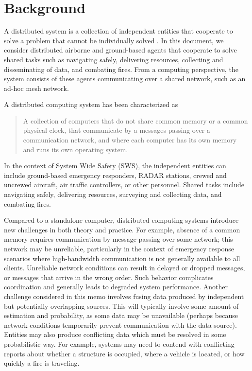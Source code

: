 \section{Background}
A distributed system is a collection of independent entities that
cooperate to solve a problem that cannot be individually solved
\cite{kshemkalyani_singhal_2008}. In this document, we consider
distributed airborne and ground-based agents that cooperate to solve
shared tasks such as navigating safely, delivering resources,
collecting and disseminating of data, and combating fires. From a
computing perspective, the system consists of these agents
communicating over a shared network, such as an ad-hoc mesh network.

A distributed computing system has been characterized as

\begin{quotation}
   A collection of computers that do not share common memory or a common
   physical clock, that communicate by a messages passing over a communication
   network, and where each computer has its own memory and runs its own
   operating system.
   \cite{10.5555/562065}
\end{quotation}


In the context of System Wide Safety (SWS), the independent entities can include ground-based emergency responders, RADAR stations, crewed and uncrewed aircraft, air traffic controllers, or other personnel. Shared tasks include navigating safely, delivering resources, surveying and collecting data, and combating fires.

Compared to a standalone computer, distributed computing systems introduce new
challenges in both theory and practice. For example, absence of a common memory requires communication by message-passing over some network; this network may be unreliable, particularly in the context of emergency response scenarios where high-bandwidth communication is not generally available to all clients. Unreliable network conditions can result in delayed or dropped messages, or messages that arrive in the wrong order. Such behavior complicates coordination and generally leads to degraded system performance. Another challenge considered in this memo involves fusing data produced by independent but potentially overlapping sources. This will typically involve some amount of estimation and probability, as some data may be unavailable (perhaps because network conditions temporarily prevent communication with the data source). Entities may also produce conflicting data which must be resolved in some probabilistic way. For example, systems may need to contend with conflicting reports about whether a structure is occupied, where a vehicle is located, or how quickly a fire is traveling.



